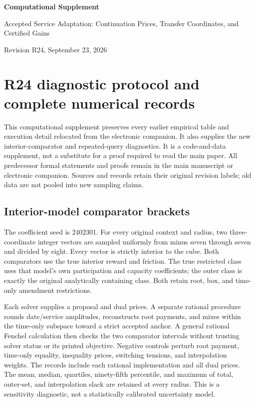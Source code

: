\documentclass[11pt,letterpaper]{article}
\theoremstyle{definition}
\newcommand{\1}{\mathbf 1}
\begin{document}
\begin{center}{\Large\bfseries Computational Supplement\par}\medskip
{\large Accepted Service Adaptation: Continuation Prices, Transfer Coordinates, and Certified Gains\par}\medskip
Revision R24, September 23, 2026
\end{center}
\section{R24 diagnostic protocol and complete numerical records}\label{cs:r24-details}
This computational supplement preserves every earlier empirical table and
execution detail relocated from the electronic companion. It also supplies the
new interior-comparator and repeated-query diagnostics. It is a code-and-data
supplement, not a substitute for a proof required to read the main paper.
All predecessor formal statements and proofs remain in the main manuscript or
electronic companion. Sources and records retain their original revision labels;
old data are not pooled into new sampling claims.

\subsection{Interior-model comparator brackets}
The coefficient seed is 2402301. For every original context and radius, two
three-coordinate integer vectors are sampled uniformly from minus seven through
seven and divided by eight. Every vector is strictly interior to the cube.
Both comparators use the true interior reward and friction. The true restricted
class uses that model's own participation and capacity coefficients; the outer
class is exactly the original analytically containing class. Both retain root,
box, and time-only amendment restrictions.

Each solver supplies a proposal and dual prices. A separate rational procedure
rounds date/service amplitudes, reconstructs root payments, and mixes within the
time-only subspace toward a strict accepted anchor. A general rational Fenchel
calculation then checks the two comparator intervals without trusting solver
status or its printed objective. Negative controls perturb root payment,
time-only equality, inequality prices, switching tensions, and interpolation
weights. The records include each rational implementation and all dual prices.
The mean, median, quartiles, ninety-fifth percentile, and maximum of total,
outer-set, and interpolation slack are retained at every radius. This is a
sensitivity diagnostic, not a statistically calibrated uncertainty model.
\end{document}
